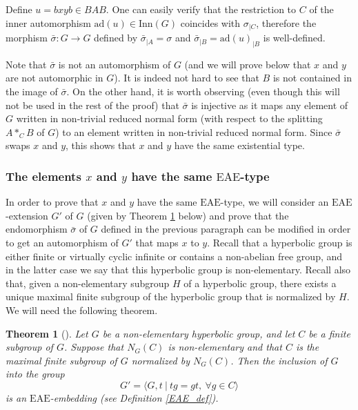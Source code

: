 \documentclass[a4paper, 11pt]{amsart}
\newtheorem{te}{Theorem}[section]
\theoremstyle{definition}
\theoremstyle{remark}
\begin{document}
\smallskip \noindent
Define $u=bxyb\in BAB$. One can easily verify that the restriction to $C$ of the inner automorphism $\mathrm{ad}(u)\in\mathrm{Inn}(G)$ coincides with $\sigma_{\vert C}$, therefore the morphism $\bar{\sigma}: G\rightarrow G$ defined by $\bar{\sigma}_{\vert A}=\sigma$ and $\bar{\sigma}_{\vert B}=\mathrm{ad}(u)_{\vert B}$ is well-defined.


\smallskip \noindent
Note that $\bar{\sigma}$ is not an automorphism of $G$ (and we will prove below that $x$ and $y$ are not automorphic in $G$). It is indeed not hard to see that $B$ is not contained in the image of $\bar{\sigma}$. On the other hand, it is worth observing (even though this will not be used in the rest of the proof) that $\bar{\sigma}$ is injective as it maps any element of $G$ written in non-trivial reduced normal form (with respect to the splitting $A\ast_C B$ of $G$) to an element written in non-trivial reduced normal form. Since $\bar{\sigma}$ swaps $x$ and $y$, this shows that $x$ and $y$ have the same existential type. 

\subsubsection{The elements $x$ and $y$ have the same $\mathrm{EAE}$-type}

In order to prove that $x$ and $y$ have the same $\mathrm{EAE}$-type, we will consider an $\mathrm{EAE}$-extension $G'$ of $G$ (given by Theorem \ref{EAE} below) and prove that the endomorphism $\bar{\sigma}$ of $G$ defined in the previous paragraph can be modified in order to get an automorphism of $G'$ that maps $x$ to $y$. Recall that a hyperbolic group is either finite or virtually cyclic infinite or contains a non-abelian free group, and in the latter case we say that this hyperbolic group is non-elementary. Recall also that, given a non-elementary subgroup $H$ of a hyperbolic group, there exists a unique maximal finite subgroup of the hyperbolic group that is normalized by $H$. We will need the following theorem.

\begin{te}[{\cite[Theorem 1.10]{And19a}}]\label{EAE}Let $G$ be a non-elementary hyperbolic group, and let $C$ be a finite subgroup of $G$. Suppose that $N_G(C)$ is non-elementary and that $C$ is the maximal finite subgroup of $G$ normalized by $N_G(C)$. Then the inclusion of $G$ into the group \[G'=\langle G,t \ \vert \ tg=gt, \ \forall g\in C\rangle\] is an $\mathrm{EAE}$-embedding (see Definition \ref{EAE_def}).\end{te}
\end{document}
